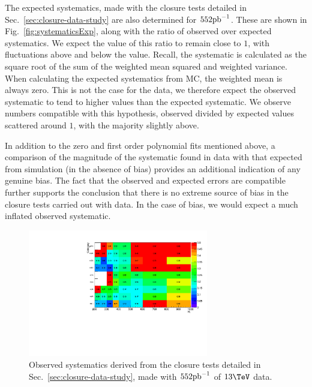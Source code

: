 The expected systematics, made with the
closure tests detailed in Sec.~\ref{sec:closure-data-study} are also
determined for $552\ipb$. These are shown in
Fig.~\ref{fig:systematicsExp}, along with the ratio of observed over
expected systematics. We expect the value of this ratio to remain
close to $1$, with
fluctuations above and below the value. Recall, the
systematic is calculated as the square root of the sum of the weighted
mean squared and weighted variance. When calculating the expected
systematics from MC, the weighted mean is always zero. This is not the
case for the data, we therefore expect the observed systematic to
tend to higher values than the expected systematic. We observe numbers
compatible with this hypothesis, observed divided by expected values
scattered around $1$, with the majority slightly above. 

In addition to
the zero and first order polynomial fits mentioned above, a comparison
of the magnitude of the systematic found in data with that expected
from simulation (\ie in the absence of bias) provides an
additional indication of any genuine bias. The fact
that the observed and expected errors are compatible further supports
the conclusion that there is no extreme source of bias in the closure
tests carried out with data. In the case of bias, we would expect a
much inflated observed systematic.

\begin{figure}[]
  \centering
  \includegraphics[width=0.7\textwidth]{figures/closureTests/552pb/mht130/obs2D.pdf}
  \caption{\label{fig:systematicsObs} Observed systematics derived from
  the closure tests detailed in Sec.~\ref{sec:closure-data-study}, made with $552\ipb$ of $13\tev$ data.}
\end{figure}

